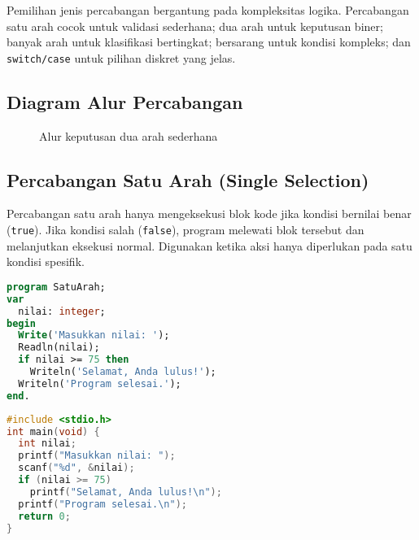 \documentclass[../main.tex]{subfiles}
\begin{document}
Pemilihan jenis percabangan bergantung pada kompleksitas logika. Percabangan satu arah cocok untuk validasi sederhana; dua arah untuk keputusan biner; banyak arah untuk klasifikasi bertingkat; bersarang untuk kondisi kompleks; dan \texttt{switch/case} untuk pilihan diskret yang jelas.

\subsection{Diagram Alur Percabangan}
\begin{figure}[H]
  \centering
  \caption{Alur keputusan dua arah sederhana}
\end{figure}

\subsection{Percabangan Satu Arah (Single Selection)}
Percabangan satu arah hanya mengeksekusi blok kode jika kondisi bernilai benar (\texttt{true}). Jika kondisi salah (\texttt{false}), program melewati blok tersebut dan melanjutkan eksekusi normal. Digunakan ketika aksi hanya diperlukan pada satu kondisi spesifik.

\begin{lstlisting}[language=Pascal, caption={Percabangan satu arah di Pascal}]
program SatuArah;
var
  nilai: integer;
begin
  Write('Masukkan nilai: ');
  Readln(nilai);
  if nilai >= 75 then
    Writeln('Selamat, Anda lulus!');
  Writeln('Program selesai.');
end.
\end{lstlisting}

\begin{lstlisting}[language=C, caption={Percabangan satu arah di C}]
#include <stdio.h>
int main(void) {
  int nilai;
  printf("Masukkan nilai: ");
  scanf("%d", &nilai);
  if (nilai >= 75)
    printf("Selamat, Anda lulus!\n");
  printf("Program selesai.\n");
  return 0;
}
\end{lstlisting}
\end{document}

